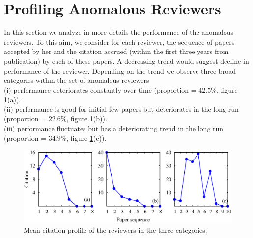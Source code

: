 \noindent
\section{Profiling Anomalous Reviewers}
\label{profile}


In this section we analyze in more details the performance of the anomalous reviewers. To this aim, we consider for each reviewer, the sequence of papers accepted by her and the citation accrued (within the first three years from publication) by each of these papers. A decreasing trend would suggest decline in performance of the reviewer. Depending on the trend we observe three broad categories within the set of anomalous reviewers \\
(i) performance deteriorates constantly over time (proportion = $42.5\%$, figure \ref{cit_prof}(a)).\\
(ii) performance is good for initial few papers but deteriorates in the long run (proportion = $22.6\%$, figure \ref{cit_prof}(b)).\\
(iii) performance fluctuates but has a deteriorating trend in the long run (proportion = $34.9\%$, figure \ref{cit_prof}(c)).
\begin{figure}
\centering
\includegraphics[scale=0.3]{figures/profile_all.eps}
\caption{\label{cit_prof} Mean citation profile of the reviewers in the three categories.}
\vspace{-.4cm}
\end{figure}

\medskip